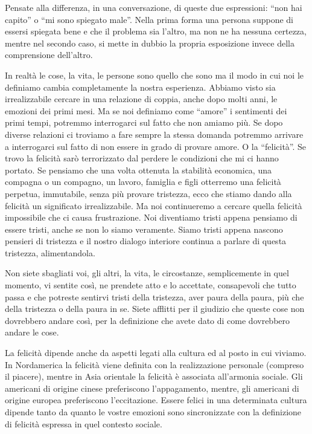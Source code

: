 \documentclass[12pt]{book} %
\begin{document}
Pensate alla differenza, in una conversazione, di queste due espressioni: “non hai capito” o “mi sono spiegato male”.
Nella prima forma una persona suppone di essersi spiegata bene e che il problema sia l'altro, ma non ne ha nessuna
certezza, mentre nel secondo caso, si mette in dubbio la propria esposizione invece della comprensione dell'altro.

In realtà le cose, la vita, le persone sono quello che sono ma il modo in cui noi le definiamo cambia completamente la
nostra esperienza. Abbiamo visto sia irrealizzabile cercare in una relazione di coppia, anche dopo molti anni, le
emozioni dei primi mesi. Ma se noi definiamo come “amore” i sentimenti dei primi tempi, potremmo interrogarci sul fatto
che non amiamo più. Se dopo diverse relazioni ci troviamo a fare sempre la stessa domanda potremmo arrivare a
interrogarci sul fatto di non essere in grado di provare amore. O la “felicità”. Se trovo la felicità sarò terrorizzato
dal perdere le condizioni che mi ci hanno portato. Se pensiamo che una volta ottenuta la stabilità economica, una
compagna o un compagno, un lavoro, famiglia e figli otterremo una felicità perpetua, immutabile, senza più provare
tristezza, ecco che stiamo dando alla felicità un significato irrealizzabile. Ma noi continueremo a cercare quella
felicità impossibile che ci causa frustrazione. Noi diventiamo tristi appena pensiamo di essere tristi, anche se non lo
siamo veramente. Siamo tristi appena nascono pensieri di tristezza e il nostro dialogo interiore continua a parlare di
questa tristezza, alimentandola.

Non siete sbagliati voi, gli altri, la vita, le circostanze, semplicemente in quel momento, vi sentite così, ne prendete
atto e lo accettate, consapevoli che tutto passa e che potreste sentirvi tristi della tristezza, aver paura della
paura, più che della tristezza o della paura in se. Siete afflitti per il giudizio che queste cose non dovrebbero
andare così, per la definizione che avete dato di come dovrebbero andare le cose. 

La felicità dipende anche da aspetti legati alla cultura ed al posto in cui viviamo. In Nordamerica la felicità viene
definita con la realizzazione personale (compreso il piacere), mentre in Asia orientale la felicità è associata
all'armonia sociale. Gli americani di origine cinese preferiscono
l'appagamento, mentre, gli americani di origine europea preferiscono
l'eccitazione.\newline
Essere felici in una determinata cultura dipende tanto da quanto le vostre emozioni sono sincronizzate con la
definizione di felicità espressa in quel contesto sociale. 
\end{document}
